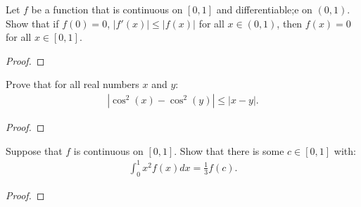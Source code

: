 \documentclass[11pt,twoside,openany]{memoir}
\begin{document}
\newpage
\fancyhead[L]{\scalebox{0.9}{Derivatives and the Mean Value Theorem}}
\fancyhead[R]{\scalebox{0.9}{Appeared on: S16}}
\begin{problem}
    Let $f$ be a function that is continuous on $[0,1]$ and differentiable;e on $(0,1)$. Show that if $f(0) = 0$, $|f'(x)| \leq |f(x)|$ for all $x \in (0,1)$, then $f(x) = 0$ for all $x \in [0,1]$.
\end{problem}
\begin{proof}
\end{proof}

\newpage
\fancyhead[L]{\scalebox{0.9}{Derivatives and the Mean Value Theorem}}
\fancyhead[R]{\scalebox{0.9}{Appeared on: F15}}
\begin{problem}
    Prove that for all real numbers $x$ and $y$:
        \begin{equation*}
        \begin{split}
            |\cos^2(x) - \cos^2(y)| \leq |x-y|.
        \end{split}
        \end{equation*}
\end{problem}
\begin{proof}
\end{proof}

\newpage
\fancyhead[L]{\scalebox{0.9}{Derivatives and the Mean Value Theorem}}
\fancyhead[R]{\scalebox{0.9}{Appeared on: S24}}
\begin{problem}
    Suppose that $f$ is continuous on $[0,1]$. Show that there is some $c \in [0,1]$ with:
        \begin{equation*}
        \begin{split}
            \int_{0}^1 x^2 f(x)dx = \frac{1}{3}f(c).
        \end{split}
        \end{equation*}
\end{problem}
\begin{proof}
\end{proof}
\end{document}

